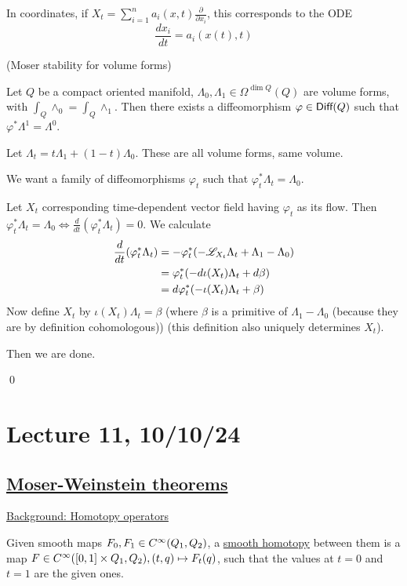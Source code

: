 \documentclass[x11names,reqno,14pt]{extarticle}
\newcommand{\dd}[2]{\frac{d#1}{d#2}}
\newcommand{\pp}[2]{\frac{\partial #1}{\partial #2}}
\begin{document}
In coordinates, if $X_t = \sum_{i=1}^na_i(x,t)\pp{}{x_i}$, this corresponds to the ODE
\[
\dd{x_i}{t} = a_i(x(t),t)
\]

\thm(Moser stability for volume forms)

Let $Q$ be a compact oriented manifold, $\Lambda_0,\Lambda_1\in\Omega^{\dim Q}(Q)$ are volume forms, with $\int_Q\wedge_0 = \int_Q\wedge_1$. Then there exists a diffeomorphism $\varphi\in{{\text{\sffamily {Diff}}}}(Q)$ such that $\varphi^*\Lambda^1=\Lambda^0$. 

\proof

Let $\Lambda_t = t\Lambda_1 + (1-t)\Lambda_0$. These are all volume forms, same volume. 

We want a family of diffeomorphisms $\varphi_t$ such that $\varphi_t^*\Lambda_t = \Lambda_0$.

Let $X_t$ corresponding time-dependent vector field having $\varphi_t$ as its flow. 
Then 
$\varphi_t^*\Lambda_t = \Lambda_0 \iff \dd{}{t}(\varphi_t^*\Lambda_t) = 0$. We calculate
\begin{align*}
\dd{}{t}(\varphi_t^*\Lambda_t) & = -\varphi_t^*(-\ms{L}_{X_t}\Lambda_t + \Lambda_1-\Lambda_0) \\
& = \varphi_t^*(-d\iota(X_t)\Lambda_t + d\beta) \\
& = d\varphi_t^*(-\iota(X_t)\Lambda_t + \beta) \\
\end{align*}
Now define $X_t$ by $\iota(X_t)\Lambda_t = \beta$ (where $\beta$ is a primitive of $\Lambda_1-\Lambda_0$ (because they are by definition cohomologous)) (this definition also uniquely determines $X_t$). 

Then we are done.

\qed

\section*{Lecture 11, 10/10/24}

\subsection*{\underline{Moser-Weinstein theorems}}

\underline{Background: Homotopy operators}


Given smooth maps $F_0,F_1\in C^\infty(Q_1,Q_2)$, a \underline{smooth homotopy} between them is a map $F \in C^\infty([0,1]\times Q_1,Q_2), (t, q) \mapsto F_t(q)$, such that the values at $t = 0$ and $t = 1$ are the given ones.
\end{document}
